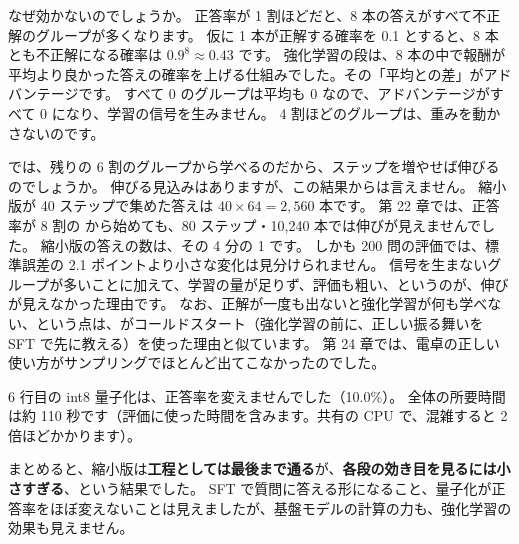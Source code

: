 なぜ効かないのでしょうか。
正答率が 1 割ほどだと、8 本の答えがすべて不正解のグループが多くなります。
仮に 1 本が正解する確率を 0.1 とすると、8 本とも不正解になる確率は $0.9^{8}\approx0.43$ です。
強化学習の段は、8 本の中で報酬が平均より良かった答えの確率を上げる仕組みでした。その「平均との差」がアドバンテージです。
すべて 0 のグループは平均も 0 なので、アドバンテージがすべて 0 になり、学習の信号を生みません。
4 割ほどのグループは、重みを動かさないのです。

では、残りの 6 割のグループから学べるのだから、ステップを増やせば伸びるのでしょうか。
伸びる見込みはありますが、この結果からは言えません。
縮小版が 40 ステップで集めた答えは $40\times64=2{,}560$ 本です。
第 22 章では、正答率が 8 割の  から始めても、80 ステップ・10,240 本では伸びが見えませんでした。
縮小版の答えの数は、その 4 分の 1 です。
しかも 200 問の評価では、標準誤差の 2.1 ポイントより小さな変化は見分けられません。
信号を生まないグループが多いことに加えて、学習の量が足りず、評価も粗い、というのが、伸びが見えなかった理由です。
なお、正解が一度も出ないと強化学習が何も学べない、という点は、がコールドスタート（強化学習の前に、正しい振る舞いを SFT で先に教える）を使った理由と似ています。
第 24 章では、電卓の正しい使い方がサンプリングでほとんど出てこなかったのでした。

6 行目の int8 量子化は、正答率を変えませんでした（10.0\%）。
全体の所要時間は約 110 秒です（評価に使った時間を含みます。共有の CPU で、混雑すると 2 倍ほどかかります）。

まとめると、縮小版は\textbf{工程としては最後まで通る}が、\textbf{各段の効き目を見るには小さすぎる}、という結果でした。
SFT で質問に答える形になること、量子化が正答率をほぼ変えないことは見えましたが、基盤モデルの計算の力も、強化学習の効果も見えません。

